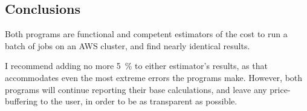 \documentclass[11pt]{article}
\begin{document}
	\FloatBarrier
	
	\begin{multicols}{2}
		
		\section{Conclusions}
		
		Both programs are functional and competent estimators of the cost to run a batch of jobs on an AWS cluster, and find nearly identical results.
		
		I recommend adding no more \SI{5}{\percent} to either estimator's results, as that accommodates even the most extreme errors the programs make. However, both programs will continue reporting their base calculations, and leave any price-buffering to the user, in order to be as transparent as possible.
		
	\end{multicols}
	
	
\end{document}
